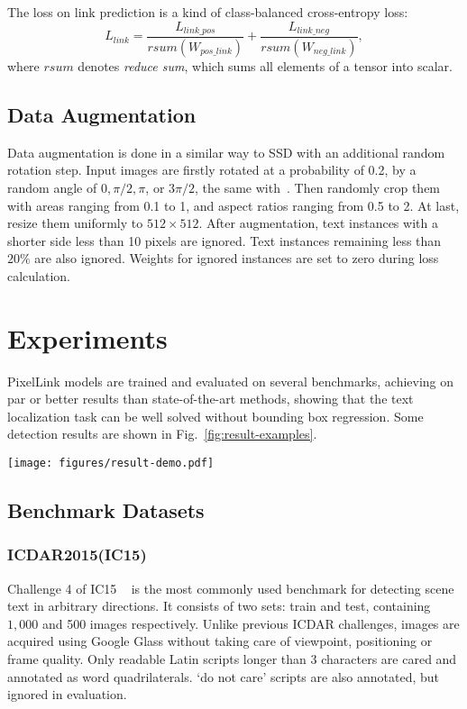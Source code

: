 \documentclass[letterpaper]{article} \usepackage{aaai18}  \usepackage{times}  \usepackage{helvet}  \usepackage{courier}  \usepackage{url}  \usepackage{graphicx}
\begin{document}
	The loss on link prediction is a kind of class-balanced cross-entropy loss:
	\begin{equation}
	L_{link} = \frac{L_{link\_pos}}{rsum(W_{pos\_link})} + \frac{L_{link\_neg}}{rsum(W_{neg\_link})}, 
	\end{equation}
	where $rsum$ denotes \emph{reduce sum}, which sums all elements of a tensor into scalar.
	
	\subsection{Data Augmentation}
	Data augmentation is done in a similar way to SSD with an additional random rotation step. Input images are firstly rotated at a probability of 0.2, by a random angle of $0, \pi / 2, \pi$, or $3\pi/2$, the same with~\cite{He2017DDR}. Then randomly crop them with areas ranging from 0.1 to 1, and aspect ratios ranging from 0.5 to 2. At last, resize them uniformly to $512 \times 512$.
	After augmentation, text instances with a shorter side less than 10 pixels are ignored. Text instances remaining less than $20\%$ are also ignored. Weights for ignored instances are set to zero during loss calculation.
	
	\section{Experiments}
	\label{sec:benchmark-results}
	PixelLink models are trained and evaluated on several benchmarks, achieving on par or better results than state-of-the-art methods, showing that the text localization task can be well solved without bounding box regression. Some detection results are shown in \mbox{Fig.~\ref{fig:result-examples}}. 
	\begin{figure*}
		\begin{center}
			\texttt{[image: figures/result-demo.pdf]}
		\end{center}
		\caption{Examples of detection results. From left to right in columns: IC15, IC13, and MSRA-TD500.}
		\label{fig:result-examples}
	\end{figure*}
	\subsection{Benchmark Datasets}
	\subsubsection{ICDAR2015(IC15)}
	Challenge 4 of IC15 ~\cite{Karatzas2015ICDAR} is the most commonly used benchmark for detecting scene text in arbitrary directions. It consists of two sets: train and test, containing $1,000$ and 500 images respectively. Unlike previous ICDAR challenges, images are acquired using Google Glass without taking care of viewpoint, positioning or frame quality. Only readable Latin scripts longer than 3 characters are cared and annotated as word quadrilaterals. `do not care' scripts are also annotated, but ignored in evaluation.
\end{document}
